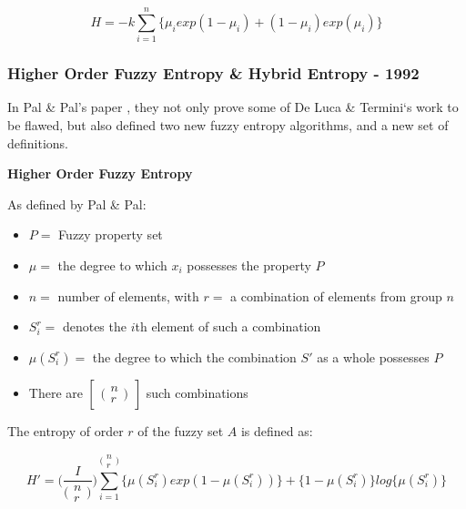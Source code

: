 \begin{equation} \label{eq:pal-pal-orig}
  H = -k  \displaystyle\sum_{i=1}^{n}{\{\mu_iexp(1 - \mu_i) + (1 - \mu_i)exp(\mu_i)\}}
\end{equation}

\subsubsection{Higher Order Fuzzy Entropy \& Hybrid Entropy - 1992}
\label{sssec:hybrid-section}

In Pal \& Pal's paper  \cite{Pal_Pal_1992}, they not only prove some of De Luca \& Termini`s work to be flawed, but also defined two new fuzzy entropy algorithms, and a new set of definitions.

\noindent \textbf{Higher Order Fuzzy Entropy}

As defined by Pal \& Pal:

\begin{itemize}
  \item $P = $ Fuzzy property set
  \item $\mu =$ the degree to which $x_i$ possesses the property $P$
  \item $n =$ number of elements, with $r =$ a combination of elements from group $n$
  \item $S^r_i =$ denotes the $i$th element of such a combination
  \item $\mu(S^r_i) =$ the degree to which the combination $S'$ as a whole possesses $P$
  \item There are $\begin{bmatrix} \bigl(\begin{smallmatrix}
  n \\ r
  \end{smallmatrix} \bigr) \end{bmatrix}$ such combinations
\end{itemize}

The entropy of order $r$ of the fuzzy set $A$ is defined as:

\begin{equation} \label{eq:higher-order}
  H' = \bigg(\frac{I}{\bigl(\begin{smallmatrix}
  n \\ r
\end{smallmatrix} \bigr)}\bigg) \displaystyle\sum_{i=1}^{\bigl(\begin{smallmatrix}
  n \\ r
  \end{smallmatrix} \bigr)} \{ \mu(S^r_i)exp(1 - \mu(S^r_i)) \} + \{ 1 - \mu(S^r_i) \}log\{\mu(S^r_i)\}
\end{equation}

